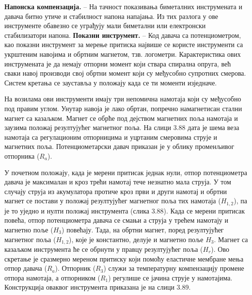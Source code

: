 \documentclass[12pt,a4paper]{report}
\begin{document}
\textbf{Напонска компензација.} – На тачност показивања биметалних инструмената и давача битно утиче и стабилност напона напајања. Из тих разлога у ове инструменте обавезно се уграђују мали биметални или електронски стабилизатори напона.
\textbf{Показни инструмент.} – Код давача са потенциометром, као показни инструмент за мерење притиска највише се користе инструменти са укрштеним навојима и обртним магнетом, тзв. логометри. Карактеристика ових инструмената је да немају отпорни момент који ствара спирална опруга, већ сваки навој производи свој обртни момент који су међусобно супротних смерова. Систем кретања се зауставља у положају када се ти моменти изједначе.

На возилама ови инструменти имају три непомична намотаја који су међусобно под правим углом. Унутар навоја је лако обртан, попречно намагнетисан стални магнет са казаљком. Магнет се обрће под дејством магнетних поља намотаја и заузима положај резултујућег магнетног поља. На слици 3.88 дата је шема веза намотаја са регулационим отпорницима и уцртаним смеровима струје и магнетних поља. Потенциометарски давач приказан је у облику променљивог отпорника ($R_a$).


У почетном положају, када је мерени притисак једнак нули, отпор потенциометра давача је максималан и кроз трећи намотај тече незнатно мала струја. У том случају струја из акумулатора протиче кроз први и други намотај и обртни магнет се постави у положај резултујућег магнетног поља тих намотаја ($H_{1,2}$), па је то уједно и нулти положај инструмента (слика 3.88). Када се мерени притисак повећа, отпор потенциометра давача се смањи а струја у трећем намотају и магнетно поље ($H_3$) повећају. Тада, на обртни магнет, поред резултујућег магнетног поља ($H_{1,2}$), које је константно, делује и магнетно поље $H_3$. Магнет са казаљком инструмента ће се обрнути у правцу резултујућег поља ($H_r$). Ово скретање је сразмерно мереном притиску који помоћу еластичне мембране мења отпор давача ($R_a$).
Отпорник ($R_3$) служи за температурну компензацију промене отпора намотаја, а отпорником ($R_1$) регулише се јачина струје у намотајима. Конструкција оваквог инструмента приказана је на слици 3.89.
\end{document}
